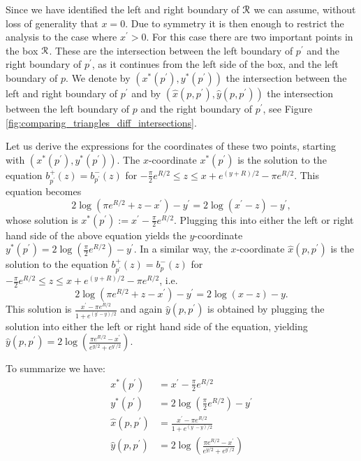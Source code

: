 Since we have identified the left and right boundary of ${\mathcal R}$ we can assume, without loss of generality that $x = 0$. Due to symmetry it is then enough to restrict the analysis to the case where $x^\prime > 0$. 
For this case there are two important points in the box ${\mathcal R}$. These are the intersection between the left boundary of $p^\prime$ and the right boundary of $p^\prime$, as it continues from the left side of the box, and the left boundary of $p$. We denote by $(x^\ast(p^\prime), y^\ast(p^\prime))$ the intersection between the left and right boundary of $p^\prime$ and by $(\hat{x}(p,p^\prime), \hat{y}(p,p^\prime))$ the intersection between the left boundary of $p$ and the right boundary of $p^\prime$, see Figure \ref{fig:comparing_triangles_diff_intersections}. 

Let us derive the expressions for the coordinates of these two points, starting with $(x^\ast(p^\prime), y^\ast(p^\prime))$. The $x$-coordinate $x^\ast(p^\prime)$ is the solution to the equation $b_{p^\prime}^+(z) = b_{p^\prime}^-(z)$ for $-\frac{\pi}{2} e^{R/2} \le z \le x + e^{(y + R)/2} - \pi e^{R/2}$. This equation becomes
\[
	2\log\left(\pi e^{R/2} + z - x^\prime\right) - y^\prime = 2 \log\left(x^\prime-z\right) - y^\prime,
\]
whose solution is $x^\ast(p^\prime) := x^\prime - \frac{\pi}{2} e^{R/2}$. Plugging this into either the left or right hand side of the above equation yields the $y$-coordinate $y^\ast(p^\prime) = 2\log\left(\frac{\pi}{2}e^{R/2}\right) - y^\prime$. In a similar way, the $x$-coordinate $\hat{x}(p,p^\prime)$ is the solution to the equation $b_{p^\prime}^+(z) = b_{p}^-(z)$ for $-\frac{\pi}{2} e^{R/2} \le z \le x + e^{(y + R)/2} - \pi e^{R/2}$, i.e.
\[
	2\log\left(\pi e^{R/2} + z - x^\prime\right) - y^\prime = 2 \log\left(x-z\right) - y.
\] 
This solution is $\frac{x^\prime - \pi e^{R/2}}{1 + e^{(y^\prime - y)/2}}$ and again $\hat{y}(p,p^\prime)$ is obtained by plugging the solution into either the left or right hand side of the equation, yielding $\hat{y}(p,p^\prime) = 2 \log\left(\frac{\pi e^{R/2} - x^\prime}{e^{y/2} + e^{y^\prime/2}}\right)$.

To summarize we have:
\begin{align*}
	x^\ast(p^\prime) &= x^\prime - \frac{\pi}{2} e^{R/2}\\
	y^\ast(p^\prime) &= 2\log\left(\frac{\pi}{2}e^{R/2}\right) - y^\prime\\
	\hat{x}(p,p^\prime) &= \frac{x^\prime - \pi e^{R/2}}{1 + e^{(y^\prime - y)/2}} \\
	\hat{y}(p,p^\prime) &= 2 \log\left(\frac{\pi e^{R/2} - x^\prime}{e^{y/2} + e^{y^\prime/2}}\right)
\end{align*}


